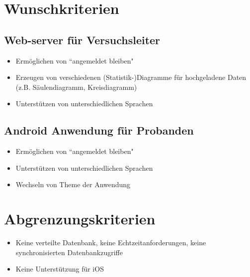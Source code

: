 \documentclass[a4paper]{scrreprt}
\begin{document}
 
        \section{Wunschkriterien}
            \vspace*{0.3cm}
            
            \subsection{Web-server f\"ur Versuchsleiter}
                \begin{itemize}
                    \item Erm\"oglichen von ``angemeldet bleiben"
                    \item Erzeugen von verschiedenen (Statistik-)Diagramme f\"ur hochgeladene Daten (z.B. S\"aulendiagramm, Kreisdiagramm) 
                    \item Unterst\"utzen von unterschiedlichen Sprachen
                    
                \end{itemize}

            \subsection{Android Anwendung f\"ur Probanden}
                \begin{itemize}
                    \item Erm\"oglichen von ``angemeldet bleiben"
                    \item Unterst\"utzen von unterschiedlichen Sprachen
                    \item Wechseln von Theme der Anwendung
                \end{itemize}
                \vspace*{0.5cm}

 
        \section{Abgrenzungskriterien}
            \begin{itemize}
                \item Keine verteilte Datenbank, keine Echtzeitanforderungen, keine synchronisierten Datenbankzugriffe
                \item Keine Unterst\"utzung f\"ur iOS
            \end{itemize}
 
\end{document}
